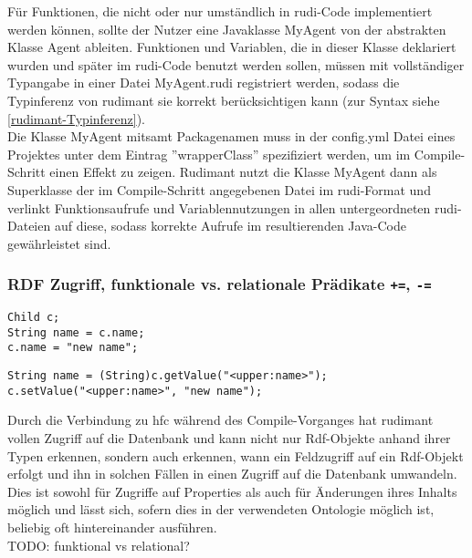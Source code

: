 Für Funktionen, die nicht oder nur umständlich in rudi-Code implementiert werden können, sollte der Nutzer eine Javaklasse MyAgent von der abstrakten Klasse Agent ableiten. Funktionen und Variablen, die in dieser Klasse deklariert wurden und später im rudi-Code benutzt werden sollen, müssen mit vollständiger Typangabe in einer Datei MyAgent.rudi registriert werden, sodass die Typinferenz von rudimant sie korrekt berücksichtigen kann (zur Syntax siehe \ref{rudimant-Typinferenz}).\\
Die Klasse MyAgent mitsamt Packagenamen muss in der config.yml Datei eines Projektes unter dem Eintrag ''wrapperClass'' spezifiziert werden, um im Compile-Schritt einen Effekt zu zeigen. Rudimant nutzt die Klasse MyAgent dann als Superklasse der im Compile-Schritt angegebenen Datei im rudi-Format und verlinkt Funktionsaufrufe und Variablennutzungen in allen untergeordneten rudi-Dateien auf diese, sodass korrekte Aufrufe im resultierenden Java-Code gewährleistet sind.

\subsubsection{RDF Zugriff, funktionale vs. relationale Prädikate
  \texttt{+=}, \texttt{-=}}

\begin{minipage}{0.4\textwidth}
\begin{verbatim}
Child c;
String name = c.name;
c.name = "new name";
\end{verbatim}
\end{minipage}
\begin{minipage}{0.6\textwidth}
\begin{verbatim}
String name = (String)c.getValue("<upper:name>");
c.setValue("<upper:name>", "new name");
\end{verbatim}
\end{minipage}
\newline
Durch die Verbindung zu hfc während des Compile-Vorganges hat rudimant vollen Zugriff auf die Datenbank und kann nicht nur Rdf-Objekte anhand ihrer Typen erkennen, sondern auch erkennen, wann ein Feldzugriff auf ein Rdf-Objekt erfolgt und ihn in solchen Fällen in einen Zugriff auf die Datenbank umwandeln. Dies ist sowohl für Zugriffe auf Properties als auch für Änderungen ihres Inhalts möglich und lässt sich, sofern dies in der verwendeten Ontologie möglich ist, beliebig oft hintereinander ausführen.\\

TODO: funktional vs relational?

